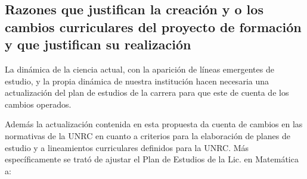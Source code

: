 \documentclass[a4paper, 12pt]{article}
\begin{document}
\subsection{Razones que justifican la creación y o los cambios curriculares del proyecto de formación  y que justifican su realización}

La dinámica de la ciencia actual, con la aparición de líneas emergentes  de estudio,  y la propia dinámica de nuestra institución hacen necesaria una actualización del plan de estudios de la carrera para que este de cuenta de los cambios operados.   


Además la actualización  contenida en esta propuesta da cuenta de cambios en las normativas de la UNRC en cuanto a criterios para la elaboración de  planes de estudio y a lineamientos curriculares definidos para la UNRC. Más específicamente se trató de ajustar el Plan de Estudios de la Lic. en Matemática a:
\end{document}
